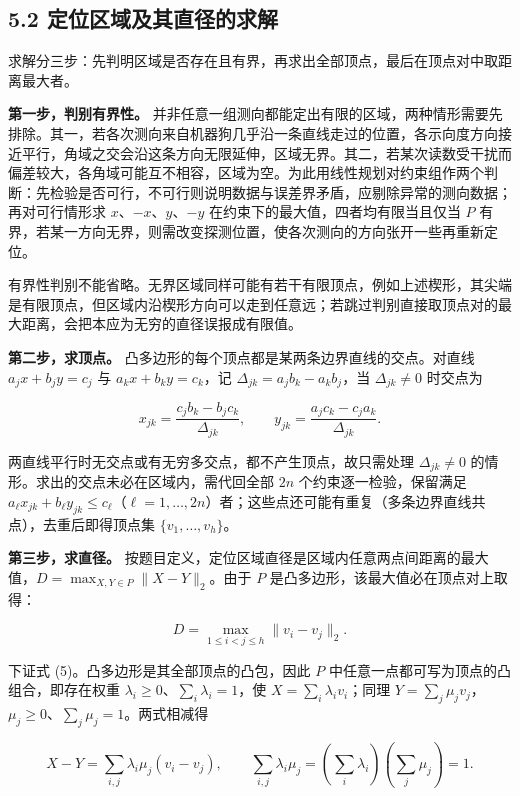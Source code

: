 \documentclass[UTF8,a4paper,zihao=-4,fontset=fandol]{ctexart}
\begin{document}
\subsection*{5.2 定位区域及其直径的求解}

求解分三步：先判明区域是否存在且有界，再求出全部顶点，最后在顶点对中取距离最大者。

\textbf{第一步，判别有界性。} 并非任意一组测向都能定出有限的区域，两种情形需要先排除。其一，若各次测向来自机器狗几乎沿一条直线走过的位置，各示向度方向接近平行，角域之交会沿这条方向无限延伸，区域无界。其二，若某次读数受干扰而偏差较大，各角域可能互不相容，区域为空。为此用线性规划对约束组作两个判断：先检验是否可行，不可行则说明数据与误差界矛盾，应剔除异常的测向数据；再对可行情形求 $x$、$-x$、$y$、$-y$ 在约束下的最大值，四者均有限当且仅当 $P$ 有界，若某一方向无界，则需改变探测位置，使各次测向的方向张开一些再重新定位。

有界性判别不能省略。无界区域同样可能有若干有限顶点，例如上述楔形，其尖端是有限顶点，但区域内沿楔形方向可以走到任意远；若跳过判别直接取顶点对的最大距离，会把本应为无穷的直径误报成有限值。

\textbf{第二步，求顶点。} 凸多边形的每个顶点都是某两条边界直线的交点。对直线 $a_jx+b_jy=c_j$ 与 $a_kx+b_ky=c_k$，记 $\Delta_{jk}=a_jb_k-a_kb_j$，当 $\Delta_{jk}\ne0$ 时交点为

\[
x_{jk}=\frac{c_jb_k-b_jc_k}{\Delta_{jk}},\qquad
y_{jk}=\frac{a_jc_k-c_ja_k}{\Delta_{jk}}. \tag{4}
\]

两直线平行时无交点或有无穷多交点，都不产生顶点，故只需处理 $\Delta_{jk}\ne0$ 的情形。求出的交点未必在区域内，需代回全部 $2n$ 个约束逐一检验，保留满足 $a_\ell x_{jk}+b_\ell y_{jk}\le c_\ell$（$\ell=1,\dots,2n$）者；这些点还可能有重复（多条边界直线共点），去重后即得顶点集 $\{v_1,\dots,v_h\}$。

\textbf{第三步，求直径。} 按题目定义，定位区域直径是区域内任意两点间距离的最大值，$D=\max_{X,Y\in P}\|X-Y\|_2$。由于 $P$ 是凸多边形，该最大值必在顶点对上取得：

\[
D=\max_{1\le i<j\le h}\|v_i-v_j\|_2 . \tag{5}
\]

下证式 (5)。凸多边形是其全部顶点的凸包，因此 $P$ 中任意一点都可写为顶点的凸组合，即存在权重 $\lambda_i\ge0$、$\sum_i\lambda_i=1$，使 $X=\sum_i\lambda_iv_i$；同理 $Y=\sum_j\mu_jv_j$，$\mu_j\ge0$、$\sum_j\mu_j=1$。两式相减得

\[
X-Y=\sum_{i,j}\lambda_i\mu_j(v_i-v_j),
\qquad
\sum_{i,j}\lambda_i\mu_j=\left(\sum_i\lambda_i\right)\left(\sum_j\mu_j\right)=1 .
\]
\end{document}
